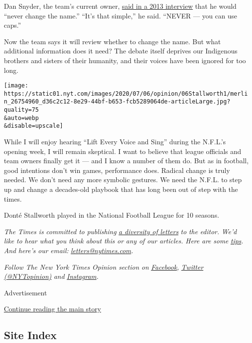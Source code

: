 Dan Snyder, the team's current owner,
\href{https://www.usatoday.com/story/sports/nfl/redskins/2013/05/09/washington-redskins-daniel-snyder/2148127/}{said
in a 2013 interview} that he would ``never change the name.'' ``It's
that simple,'' he said. ``NEVER --- you can use caps.''

Now the team says it will review whether to change the name. But what
additional information does it need? The debate itself deprives our
Indigenous brothers and sisters of their humanity, and their voices have
been ignored for too long.

\texttt{[image: https://static01.nyt.com/images/2020/07/06/opinion/06Stallworth1/merlin\_26754960\_d36c2c12-8e29-44bf-b653-fcb5289064de-articleLarge.jpg?quality=75\\\&auto=webp\\\&disable=upscale]}

While I will enjoy hearing ``Lift Every Voice and Sing'' during the
N.F.L.'s opening week, I will remain skeptical. I want to believe that
league officials and team owners finally get it --- and I know a number
of them do. But as in football, good intentions don't win games,
performance does. Radical change is truly needed. We don't need any more
symbolic gestures. We need the N.F.L. to step up and change a
decades-old playbook that has long been out of step with the times.

Donté Stallworth played in the National Football League for 10 seasons.

\emph{The Times is committed to publishing}
\href{https://www.nytimes.com/2019/01/31/opinion/letters/letters-to-editor-new-york-times-women.html}{\emph{a
diversity of letters}} \emph{to the editor. We'd like to hear what you
think about this or any of our articles. Here are some}
\href{https://help.nytimes.com/hc/en-us/articles/115014925288-How-to-submit-a-letter-to-the-editor}{\emph{tips}}\emph{.
And here's our email:}
\href{mailto:letters@nytimes.com}{\emph{letters@nytimes.com}}\emph{.}

\emph{Follow The New York Times Opinion section on}
\href{https://www.facebook.com/nytopinion}{\emph{Facebook}}\emph{,}
\href{http://twitter.com/NYTOpinion}{\emph{Twitter (@NYTopinion)}}
\emph{and}
\href{https://www.instagram.com/nytopinion/}{\emph{Instagram}}\emph{.}

Advertisement

\protect\hyperlink{after-bottom}{Continue reading the main story}

\hypertarget{site-index}{%
\subsection{Site Index}\label{site-index}}

